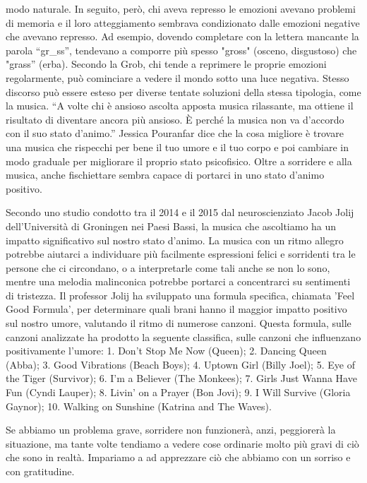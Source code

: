 \documentclass[12pt]{book} %
\begin{document}
modo naturale. In seguito, però, chi aveva represso le emozioni avevano problemi di memoria e il loro atteggiamento
sembrava condizionato dalle emozioni negative che avevano represso. Ad esempio, dovendo completare con la lettera
mancante la parola “gr\_ss”, tendevano a comporre più spesso "gross" (osceno, disgustoso)
che "grass” (erba). Secondo la Grob, chi tende a reprimere le proprie emozioni regolarmente, può
cominciare a vedere il mondo sotto una luce negativa. Stesso discorso può essere esteso per diverse tentate soluzioni
della stessa tipologia, come la musica. “A volte chi è ansioso ascolta apposta musica rilassante, ma ottiene il
risultato di diventare ancora più ansioso. È perché la musica non va d'accordo con il suo stato
d'animo.” Jessica Pouranfar dice che la cosa migliore è trovare una musica che rispecchi per bene
il tuo umore e il tuo corpo e poi cambiare in modo graduale per migliorare il proprio stato
psicofisico. 
Oltre a sorridere e alla musica, anche fischiettare sembra capace di portarci in uno stato d'animo positivo.

Secondo uno studio condotto tra il 2014 e il 2015 dal neuroscienziato Jacob Jolij dell'Università di Groningen nei Paesi Bassi, la musica che ascoltiamo ha un impatto significativo sul nostro stato d'animo. La musica con un ritmo allegro potrebbe aiutarci a individuare più facilmente espressioni felici e sorridenti tra le persone che ci circondano, o a interpretarle come tali anche se non lo sono, mentre una melodia malinconica potrebbe portarci a concentrarci su sentimenti di tristezza. Il professor Jolij ha sviluppato una formula specifica, chiamata 'Feel Good Formula', per determinare quali brani hanno il maggior impatto positivo sul nostro umore, valutando il ritmo di numerose canzoni. Questa formula, sulle canzoni analizzate ha prodotto la seguente classifica, sulle canzoni che influenzano positivamente l'umore: 1. Don't Stop Me Now (Queen); 2. Dancing Queen (Abba); 3. Good Vibrations (Beach Boys); 4. Uptown Girl (Billy Joel); 5. Eye of the Tiger (Survivor); 6. I'm a Believer (The Monkees); 7. Girls Just Wanna Have Fun (Cyndi Lauper); 8. Livin' on a Prayer (Bon Jovi); 9. I Will Survive (Gloria Gaynor); 10. Walking on Sunshine (Katrina and The Waves).

Se abbiamo un problema grave, sorridere non funzionerà, anzi, peggiorerà la situazione, ma tante volte tendiamo a vedere
cose ordinarie molto più gravi di ciò che sono in realtà. Impariamo a ad apprezzare ciò che abbiamo con un sorriso e
con gratitudine.
\end{document}
